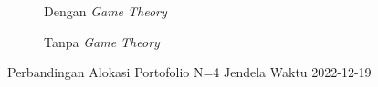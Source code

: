 \begin{figure}[!htbp]
    \centering
    \begin{subfigure}[b]{0.48\textwidth}
        \centering
        


        \caption{Dengan \textit{Game Theory}}
    \end{subfigure}
    \hfill
    \begin{subfigure}[b]{0.48\textwidth}
        \centering
        


        \caption{Tanpa \textit{Game Theory}}
    \end{subfigure}
    \caption{Perbandingan Alokasi Portofolio N=4 Jendela Waktu 2022-12-19}
    \label{fig:window_n4_2022_12_19}
\end{figure}

%         
% 
% 
%         
% 
% 

%         
% 
% 
%         
% 
% 

